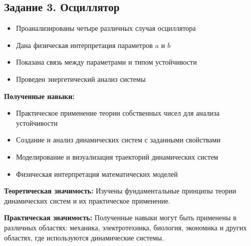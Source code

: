 \subsection*{Задание 3. Осциллятор}

\begin{itemize}
    \item Проанализированы четыре различных случая осциллятора
    \item Дана физическая интерпретация параметров $a$ и $b$
    \item Показана связь между параметрами и типом устойчивости
    \item Проведен энергетический анализ системы
\end{itemize}

\textbf{Полученные навыки:}
\begin{itemize}
    \item Практическое применение теории собственных чисел для анализа устойчивости
    \item Создание и анализ динамических систем с заданными свойствами
    \item Моделирование и визуализация траекторий динамических систем
    \item Физическая интерпретация математических моделей
\end{itemize}

\textbf{Теоретическая значимость:} Изучены фундаментальные принципы теории динамических систем и их практическое применение.

\textbf{Практическая значимость:} Полученные навыки могут быть применены в различных областях: механика, электротехника, биология, экономика и других областях, где используются динамические системы.
